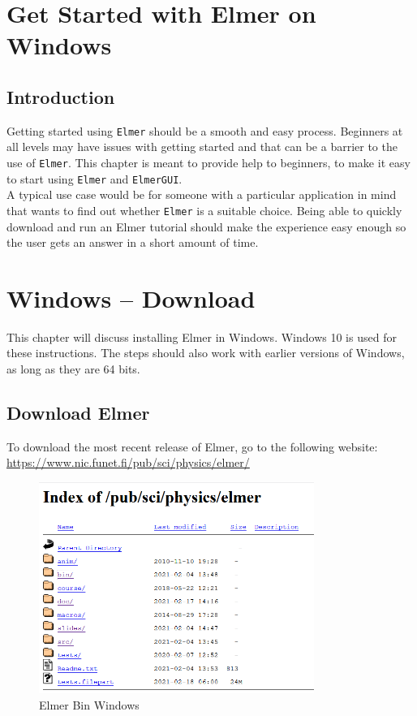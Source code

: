 \chapter{Get Started with Elmer on Windows}

\section{Introduction}

Getting started using \texttt{Elmer} should be a smooth and easy process.  Beginners at all levels may have issues with getting started and that can be a barrier to the use of  \texttt{Elmer}.  This chapter is meant to provide help to beginners, to make it easy to start using \texttt{Elmer} and \texttt{ElmerGUI}.\\

A typical use case would be for someone with a particular application in mind that wants to find out whether \texttt{Elmer} is a suitable choice.  Being able to quickly download and run an Elmer tutorial should make the experience easy enough so the user gets an answer in a short amount of time.

\chapter{Windows -- Download}

This chapter will discuss installing Elmer in Windows.  Windows 10 is used for these instructions.  The steps should also work with earlier versions of Windows, as long as they are 64 bits.

\section{Download Elmer}

To download the most recent release of Elmer, go to the following website:\\

\url{https://www.nic.funet.fi/pub/sci/physics/elmer/}

\begin{figure}[H]
\centering
\includegraphics[width=0.8\textwidth]{elmer}
\caption{Elmer Bin Windows}\label{fg:elmer}
\end{figure}

